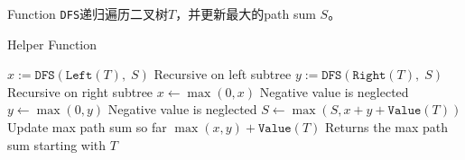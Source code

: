 \begin{CJK*}{UTF8}{gbsn}
Function \texttt{DFS}递归遍历二叉树$T$，并更新最大的path sum $S$。
\end{CJK*}
\begin{algorithm}[H]
\caption{Helper Function}
\begin{algorithmic}[1]
\State {}
\EndIf
\State $x:=\texttt{DFS}(\texttt{Left}(T),\;S)$ \Comment Recursive on left subtree
\State $y:=\texttt{DFS}(\texttt{Right}(T),\;S)$ \Comment Recursive on right subtree
\State $x\gets \max(0, x)$ \Comment Negative value is neglected
\State $y\gets \max(0, y)$ \Comment Negative value is neglected
\State $S\gets \max(S, x+y+\texttt{Value}(T))$ \Comment Update max path sum so far
\State \Return $\max(x,y) + \texttt{Value}(T)$ \Comment Returns the max path sum starting with $T$
\end{algorithmic}
\end{algorithm}
\begin{algorithm}[H]
\begin{algorithmic}[1]
\EndFunction
\end{algorithmic}
\end{algorithm}